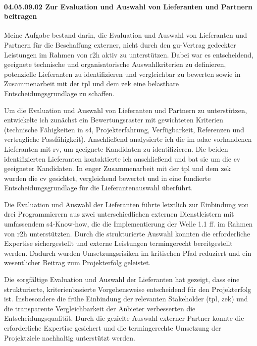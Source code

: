  \paragraph*{04.05.09.02 Zur Evaluation und Auswahl von Lieferanten und Partnern beitragen}
\label{para:04.05.09.02_Lieferantenauswahl}


\par Meine Aufgabe bestand darin, die Evaluation und Auswahl von Lieferanten und Partnern für die Beschaffung externer, nicht durch den \gls{gu}-Vertrag gedeckter Leistungen im Rahmen von \gls{r2h} aktiv zu unterstützen. Dabei war es entscheidend, geeignete technische und organisatorische Auswahlkriterien zu definieren, potenzielle Lieferanten zu identifizieren und vergleichbar zu bewerten sowie in Zusammenarbeit mit der \gls{tpl} und dem \gls{zek} eine belastbare Entscheidungsgrundlage zu schaffen.

\par Um die Evaluation und Auswahl von Lieferanten und Partnern zu unterstützen, entwickelte ich zunächst ein Bewertungsraster mit gewichteten Kriterien (technische Fähigkeiten in \gls{s4}, Projekterfahrung, Verfügbarkeit, Referenzen und vertragliche Passfähigkeit). Anschließend analysierte ich die im \gls{adac} vorhandenen Lieferanten mit \gls{rv}, um geeignete Kandidaten zu identifizieren. Die beiden identifizierten Lieferanten kontaktierte ich anschließend und bat sie um die \gls{cv} geeigneter Kandidaten. In enger Zusammenarbeit mit der \gls{tpl} und dem \gls{zek} wurden die \gls{cv} gesichtet, vergleichend bewertet und in eine fundierte Entscheidungsgrundlage für die Lieferantenauswahl überführt.

\par Die Evaluation und Auswahl der Lieferanten führte letztlich zur Einbindung von drei Programmierern aus zwei unterschiedlichen externen Dienstleistern mit umfassendem \gls{s4}-Know-how, die die Implementierung der Welle 1.1 ff. im Rahmen von \gls{r2h} unterstützten. Durch die strukturierte Auswahl konnten die erforderliche Expertise sichergestellt und externe Leistungen termingerecht bereitgestellt werden. Dadurch wurden Umsetzungsrisiken im kritischen Pfad reduziert und ein wesentlicher Beitrag zum Projekterfolg geleistet.

\par Die sorgfältige Evaluation und Auswahl der Lieferanten hat gezeigt, dass eine strukturierte, kriterienbasierte Vorgehensweise entscheidend für den Projekterfolg ist. Insbesondere die frühe Einbindung der relevanten Stakeholder (\gls{tpl}, \gls{zek}) und die transparente Vergleichbarkeit der Anbieter verbesserten die Entscheidungsqualität. Durch die gezielte Auswahl externer Partner konnte die erforderliche Expertise gesichert und die termingerechte Umsetzung der Projektziele nachhaltig unterstützt werden.
